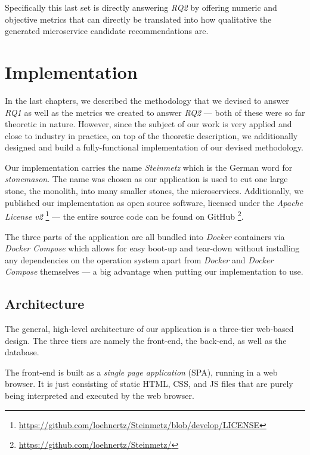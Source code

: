 \documentclass[12pt,a4paper]{report}
\begin{document}
Specifically this last set is directly answering \textit{RQ2} by offering
numeric and objective metrics that can directly be translated into how
qualitative the generated microservice candidate recommendations are.




\chapter{Implementation} \label{chap:implementation}

In the last chapters, we described the methodology that we devised to answer
\textit{RQ1} as well as the metrics we created to answer \textit{RQ2} ---
both of these were so far theoretic in nature.
However, since the subject of our work is very applied and close to industry
in practice, on top of the theoretic description, we additionally designed
and build a fully-functional implementation of our devised methodology.

Our implementation carries the name \textit{Steinmetz} which is the German
word for \textit{stonemason}. The name was chosen as our application is used
to cut one large stone, the monolith, into many smaller stones, the microservices.
Additionally, we published our implementation as open source software,
licensed under the \textit{Apache License v2}
\footnote{\url{https://github.com/loehnertz/Steinmetz/blob/develop/LICENSE}} ---
the entire source code can be found on GitHub
\footnote{\url{https://github.com/loehnertz/Steinmetz/}}.

The three parts of the application are all bundled into \textit{Docker} containers
via \textit{Docker Compose} which allows for easy boot-up and tear-down without
installing any dependencies on the operation system apart from \textit{Docker}
and \textit{Docker Compose} themselves \cite{docker} \cite{docker-compose} ---
a big advantage when putting our implementation to use.



\section{Architecture}
The general, high-level architecture of our application is a three-tier
web-based design. The three tiers are namely the front-end, the back-end,
as well as the database.

The front-end is built as a \textit{single page application} (SPA),
running in a web browser. It is just consisting of static HTML, CSS, and JS files
that are purely being interpreted and executed by the web browser.
\end{document}
